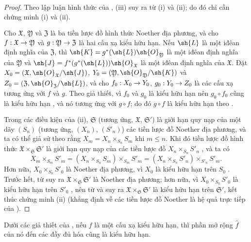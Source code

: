 \documentclass[oneside]{amsart}
\makeatletter
\renewcommand{\leq}{\leqslant}
\newcommand{\ega@arrow}[2]{\mathchoice{#1}{#2}{#2}{#2}}
\renewcommand{\to}{\ega@arrow{\longrightarrow}{\rightarrow}}
\let\EGAOriginalLabel\label
\renewcommand{\label}[1]{\phantomsection\EGAOriginalLabel{#1}}
\makeatother
\begin{document}
\begin{proof}
Theo lập luận hình thức của , (iii) suy ra từ (i) và (ii); do đó chỉ cần chứng minh (i) và (ii).

Cho $\mathfrak{X}$, $\mathfrak{Y}$ và $\mathfrak{Z}$ là ba tiền lược đồ hình thức Noether địa phương, và cho $f:\mathfrak{X}\to\mathfrak{Y}$ và $g:\mathfrak{Y}\to\mathfrak{Z}$ là hai cấu xạ kiểu hữu hạn.
Nếu $\sh{L}$ là một iđêan định nghĩa của $\mathfrak{Z}$, thì $\sh{K}=g^*(\sh{L})\sh{O}_\mathfrak{Y}$ là một iđêan định nghĩa của $\mathfrak{Y}$ và $\sh{J}=f^*(g^*(\sh{L}))\sh{O}_\mathfrak{X}$ là một iđêan định nghĩa của $\mathfrak{X}$.
Đặt $X_0=(\mathfrak{X},\sh{O}_\mathfrak{X}/\sh{J})$, $Y_0=(\mathfrak{Y},\sh{O}_\mathfrak{Y}/\sh{K})$ và $Z_0=(\mathfrak{Z},\sh{O}_\mathfrak{Z}/\sh{L})$, và cho $f_0:X_0\to Y_0$, $g_0:Y_0\to Z_0$ là các cấu xạ tương ứng với $f$ và $g$.
Theo giả thiết, vì $f_0$ và $g_0$ là kiểu hữu hạn nên $g_0\circ f_0$ cũng là kiểu hữu hạn , và nó tương ứng với $g\circ f$;
do đó $g\circ f$ là kiểu hữu hạn theo .

Trong các điều kiện của (ii), $\mathfrak{S}$ (tương ứng, $\mathfrak{X}$, $\mathfrak{S}'$) là giới hạn quy nạp của một dãy $(S_n)$ (tương ứng, $(X_n)$, $(S'_n)$) các tiền lược đồ Noether địa phương, và ta có thể giả sử theo  rằng $X_m=X_n\times_{S_n}S_m$ khi $m\leq n$.
Khi đó tiền lược đồ hình thức $\mathfrak{X}\times_\mathfrak{S}\mathfrak{S}'$ là giới hạn quy nạp của các tiền lược đồ $X_n\times_{S_n}S'_n$ , và ta có
\[
    X_m\times_{S_m}S'_m = (X_n\times_{S_n}S_m)\times_{S_m}S'_m = (X_n\times_{S_n}S'_n)\times_{S'_n}S'_m.
\]
Hơn nữa, $X_0\times_{S_0}S'_0$ là Noether địa phương, vì $X_0$ là kiểu hữu hạn trên $S_0$ .
Trước hết, từ  suy ra $\mathfrak{X}\times_\mathfrak{S}\mathfrak{S}'$ là Noether địa phương;
hơn nữa, vì $X_0\times_{S_0}S'_0$ là kiểu hữu hạn trên $S'_0$ , nên từ  và  suy ra $\mathfrak{X}\times_\mathfrak{S}\mathfrak{S}'$ là kiểu hữu hạn trên $\mathfrak{S}'$, kết thúc chứng minh (ii) (khẳng định về các tiền lược đồ Noether là hệ quả trực tiếp của ).
\end{proof}

\begin{corollary}[10.13.6]
\label{I.10.13.6}
Dưới các giả thiết của , nếu $f$ là một cấu xạ kiểu hữu hạn, thì phần mở rộng $\widehat{f}$ của nó đến các đầy đủ hóa cũng là kiểu hữu hạn.
\end{corollary}
\end{document}

